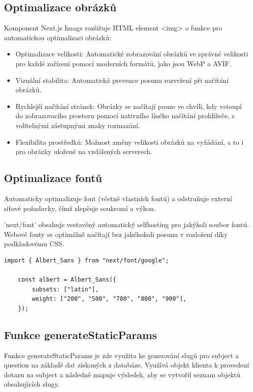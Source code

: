 \documentclass[12pt, a4paper,
oneside,      %
openright
]{report}
\begin{document}
\subsection{Optimalizace obrázků}
	Komponent Next.js Image rozšiřuje HTML element <img> o funkce pro automatickou optimalizaci obrázků:
\begin{itemize}
	\item Optimalizace velikosti: Automatické zobrazování obrázků ve správné velikosti pro každé zařízení pomocí moderních formátů, jako jsou WebP a AVIF.
	\item Vizuální stabilita: Automatická prevence posunu rozvržení při načítání obrázků.
	\item Rychlejší načítání stránek: Obrázky se načítají pouze ve chvíli, kdy vstoupí do zobrazovacího prostoru pomocí nativního líného načítání prohlížeče, s volitelnými zástupnými znaky rozmazání.
	\item Flexibilita prostředků:  Možnost změny velikosti obrázků na vyžádání, a to i pro obrázky uložené na vzdálených serverech.
\end{itemize}

\subsection{Optimalizace fontů}
Automaticky optimalizuje font (včetně vlastních fontů) a odstraňuje externí síťové požadavky, čímž zlepšuje soukromí a výkon.

'next/font' obsahuje vestavěný automatický selfhosting pro jakýkoli soubor fontů. Webové fonty se optimálně načítají bez jakéhokoli posunu v rozložení díky podkladovému CSS.

\vspace{10pt}

\begin{lstlisting}[style=JavaScript, title={Kód}, caption={Ukázka layout.js}]
	import { Albert_Sans } from "next/font/google";
	
	const albert = Albert_Sans({
		subsets: ["latin"],
		weight: ["200", "500", "700", "800", "900"],
	});
\end{lstlisting}	

\subsection{Funkce generateStaticParams}
Funkce generateStaticParams je zde využita ke generování slugů pro subject a question na základě dat získaných z databáze. Využívá objekt klienta k provedení dotazu na subject a následně mapuje výsledek, aby se vytvořil seznam objektů obsahujících slugy. 
\end{document}

